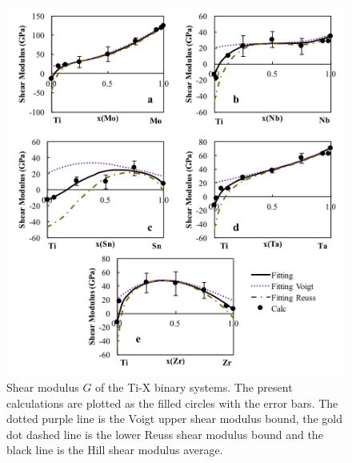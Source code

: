 \pagebreak
\begin{figure}[H]
	\centering
	\includegraphics[width=\textwidth]{Chapter-5/Figures/tixshear.png}
	\caption{Shear modulus $G$ of the Ti-X binary systems. The present calculations are plotted as the filled circles with the error bars. The dotted purple line is the Voigt upper shear modulus bound, the gold dot dashed line is the lower Reuss shear modulus bound and the black line is the Hill shear modulus average.}
	\label{Ch5-figure:tixshear}
\end{figure}

